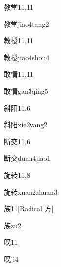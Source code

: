 \begin{entry}{教堂}{11,11}
  \begin{phonetics}{教堂}{jiao4tang2}
  \end{phonetics}
\end{entry}

\begin{entry}{教授}{11,11}
  \begin{phonetics}{教授}{jiao4shou4}
  \end{phonetics}
\end{entry}

\begin{entry}{敢情}{11,11}
  \begin{phonetics}{敢情}{gan3qing5}
  \end{phonetics}
\end{entry}

\begin{entry}{斜阳}{11,6}
  \begin{phonetics}{斜阳}{xie2yang2}
  \end{phonetics}
\end{entry}

\begin{entry}{断交}{11,6}
  \begin{phonetics}{断交}{duan4jiao1}
  \end{phonetics}
\end{entry}

\begin{entry}{旋转}{11,8}
  \begin{phonetics}{旋转}{xuan2zhuan3}
  \end{phonetics}
\end{entry}

\begin{entry}{族}{11}[Radical 方]
  \begin{phonetics}{族}{zu2}
  \end{phonetics}
\end{entry}

\begin{entry}{旣}{11}
  \begin{phonetics}{旣}{ji4}
  \end{phonetics}
\end{entry}

